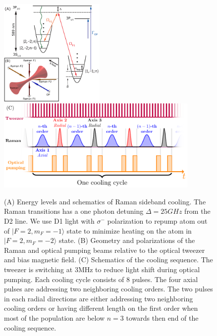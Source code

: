 \documentclass[aps,prl,twocolumn,groupedaddress]{revtex4-1}
\begin{document}
\begin{figure}
  \includegraphics[height=5.2cm]{imgs/Na_RSC_schematic.pdf}
  \includegraphics[height=4.5cm]{sequence.pdf}
  \caption{(A) Energy levels and schematics of Raman sideband cooling.
    The Raman transitions has a one photon detuning $\Delta=25GHz$ from the D2 line.
    We use D1 light with $\sigma^-$ polarization to repump atom out of $|F=2,m_F=-1\rangle$
    state to minimize heating on the atom in $|F=2,m_F=-2\rangle$ state.
    (B) Geometry and polarizations of the Raman and optical pumping beams relative to the
    optical tweezer and bias magnetic field.
    (C) Schematics of the cooling sequence. The tweezer is switching at $3\text{MHz}$ to
    reduce light shift during optical pumping. Each cooling cycle consists of $8$ pulses.
    The four axial pulses are addressing two neighboring cooling orders.
    The two pulses in each radial directions are either addressing two neighboring cooling orders
    or having different length on the first order when most of the population are below $n=3$
    towards then end of the cooling sequence.
    \label{f-setup}}
\end{figure}
\end{document}
